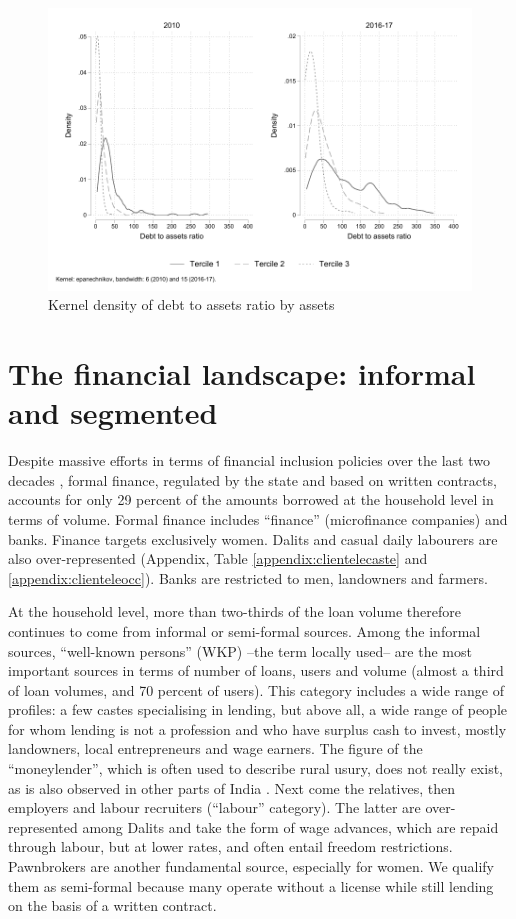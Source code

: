 \documentclass[a4paper, 11pt, onecolumn]{article}
\begin{document}
\begin{figure}[h!]
\center
\includegraphics[width=12cm]{DAR_tercile.pdf}
\caption{Kernel density of debt to assets ratio by assets}
\label{kernel:DARassets}
\end{figure}



\section{The financial landscape: informal and segmented}
\label{section:finlandscape}

Despite massive efforts in terms of financial inclusion policies over the last two decades \citep{Nair2016, Kar2018}, formal finance, regulated by the state and based on written contracts, accounts for only 29 percent of the amounts borrowed at the household level in terms of volume. 
Formal finance includes ``finance'' (microfinance companies) and banks. 
Finance targets exclusively women. 
Dalits and casual daily labourers are also over-represented (Appendix, Table \ref{appendix:clientelecaste} and \ref{appendix:clienteleocc}). 
Banks are restricted to men, landowners and farmers. 

At the household level, more than two-thirds of the loan volume therefore continues to come from informal or semi-formal sources. 
Among the informal sources, ``well-known persons'' (WKP) --the term locally used-- are the most important sources in terms of number of loans, users and volume (almost a third of loan volumes, and 70 percent of users). 
This category includes a wide range of profiles: a few castes specialising in lending, but above all, a wide range of people for whom lending is not a profession and who have surplus cash to invest, mostly landowners, local entrepreneurs and wage earners. 
The figure of the ``moneylender'', which is often used to describe rural usury, does not really exist, as is also observed in other parts of India \citep{Gregory1997}. 
Next come the relatives, then employers and labour recruiters (``labour'' category). 
The latter are over-represented among Dalits and take the form of wage advances, which are repaid through labour, but at lower rates, and often entail freedom restrictions. 
Pawnbrokers are another fundamental source, especially for women. 
We qualify them as semi-formal because many operate without a license while still lending on the basis of a written contract. 
\end{document}
